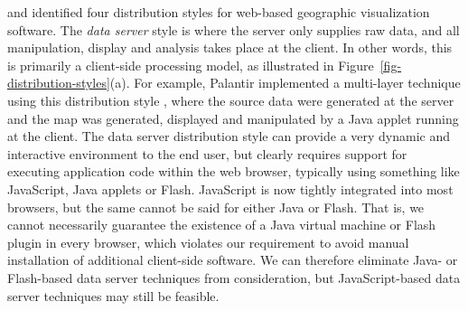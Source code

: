 \documentclass[acmtocl,acmnow]{acmtrans2m}
\begin{document}
 and  identified four
distribution styles for web-based geographic visualization software. The
\emph{data server} style is where the server only supplies raw data, and
all manipulation, display and analysis takes place at the client. In
other words, this is primarily a client-side processing model, as
illustrated in Figure~\ref{fig-distribution-styles}(a). For example,
Palantir implemented a multi-layer technique using this distribution style
\cite{Papa-N-1998-Palantir}, where the source data were generated at the
server and the map was generated, displayed and manipulated by a Java
applet running at the client. The data server distribution style can
provide a very dynamic and interactive environment to the end user, but
clearly requires support for executing application code within the web
browser, typically using something like JavaScript, Java applets or
Flash. JavaScript is now tightly integrated into most browsers, but the
same cannot be said for either Java or Flash. That is, we cannot
necessarily guarantee the existence of a Java virtual machine or Flash
plugin in every browser, which violates our requirement to avoid manual
installation of additional client-side software. We can therefore
eliminate Java- or Flash-based data server techniques from
consideration, but JavaScript-based data server techniques may still be
feasible.
\end{document}

